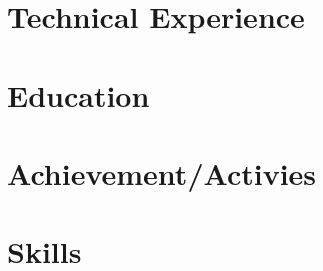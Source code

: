 \documentclass[letter,10pt]{article}
\begin{document}
% 

\section{Technical Experience}


\section{Education}


\section{Achievement/Activies}


\section{Skills}

\end{document}
